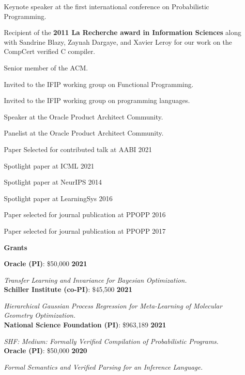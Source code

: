 \documentclass[margin,line]{res}
\begin{document}
\begin{resume}
Keynote speaker at the first international conference on Probabilistic Programming. 

Recipient of the {\bf 2011 La Recherche award in Information Sciences} along
with Sandrine Blazy, Zaynah Dargaye, and Xavier Leroy for our work on the
CompCert verified C compiler.

Senior member of the ACM.

Invited to the IFIP working group on Functional Programming.

Invited to the IFIP working group on programming languages.

Speaker at the Oracle Product Architect Community.

Panelist at the Oracle Product Architect Community.

Paper Selected for contributed talk at AABI 2021

Spotlight paper at ICML 2021

Spotlight paper at NeurIPS 2014

Spotlight paper at LearningSys 2016

Paper selected for journal publication at PPOPP 2016

Paper selected for journal publication at PPOPP 2017

\newpage
{\bf {\Large Grants}}

{\bf Oracle (PI)}: \$50,000 \hfill {\bf 2021}
\vspace{-.4cm}

{\em Transfer Learning and Invariance for Bayesian Optimization.} \\

{\bf Schiller Institute (co-PI)}: \$45,500 \hfill {\bf 2021}
\vspace{-.4cm}

{\em Hierarchical Gaussian Process Regression for Meta-Learning of Molecular Geometry Optimization.} \\

{\bf National Science Foundation (PI)}: \$963,189  \hfill {\bf 2021}
\vspace{-.4cm}

{\em SHF: Medium: Formally Verified Compilation of Probabilistic Programs.}\\

{\bf Oracle (PI)}: \$50,000 \hfill {\bf 2020}
\vspace{-.4cm}

{\em Formal Semantics and Verified Parsing for an Inference Language.} \\


\end{resume}
\end{document}
